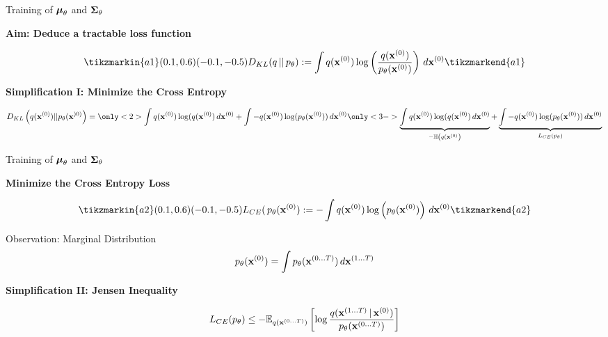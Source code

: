 \documentclass[aspectratio=169, 10pt]{beamer}
\theoremstyle{definition}
\begin{document}
\begin{frame}{Training of ${\boldsymbol{\mu}}_\theta$ and  ${\boldsymbol{\Sigma}}_\theta$}
  \begin{center}
    \textbf{Aim: Deduce a tractable loss function}
  \end{center}
    \[
      \tikzmarkin{a1}(0.1,0.6)(-0.1,-0.5)D_{KL}(q\,||\,p_\theta):=\int q(\xx^{(0)})\log\left(
      \frac{q(\xx^{(0)})}{p_\theta(\xx^{(0)})}\right)\,d
      \xx^{(0)}\tikzmarkend{a1}
    \]
    \vfill
    \pause
    \begin{center}
      \bf
      Simplification I: Minimize the Cross Entropy
    \end{center}
    \[
    D_{KL}\left( q(\xx^{(0)})||p_\theta(\xx^{)0)} \right) =
    \only<2>{\int q(\xx^{(0)})\log(q(\xx^{(0)})\,d\xx^{(0)}+
      \int-q(\xx^{(0)})\log(p_\theta(\xx^{(0)}))\,d\xx^{(0)}}
    \only<3->{\underbrace{\int q(\xx^{(0)})\log(q(\xx^{(0)})\,d\xx^{(0)}}_{-\Hh\left(
      q(\xx^{(0)}\right)} + 
    \underbrace{\int-q(\xx^{(0)})\log(p_\theta(\xx^{(0)}))\,d\xx^{(0)}}_{L_{CE}(p_\theta)}}
    \]
\end{frame}
\begin{frame}{Training of ${\boldsymbol{\mu}}_\theta$ and  ${\boldsymbol{\Sigma}}_\theta$}
  \begin{center}
    \bf
    Minimize the Cross Entropy Loss
  \end{center}
    \[
      \tikzmarkin{a2}(0.1,0.6)(-0.1,-0.5)L_{CE}(\,p_\theta(\xx^{(0)}):=-\int
        q(\xx^{(0)})\log\left( p_\theta(\xx^{(0)})\right)\,d
      \xx^{(0)}\tikzmarkend{a2}
    \]
    \pause
    \begin{block}{Observation: Marginal Distribution}
      \[
        p_\theta({\mathbf{x}}^{(0)})=\int p_\theta({\mathbf{x}}^{(0\ldots T)})\,
        d{\mathbf{x}}^{(1\ldots T)}
      \]
    \end{block}
    \pause
    \begin{center}
      \bf
      Simplification II: Jensen Inequality
    \end{center}
    \[
      L_{CE}(p_\theta) \le - \mathbb{E}_{q({\mathbf{x}}^{(0\ldots T)})}\left[ \log
      \frac{q({\mathbf{x}}^{(1\ldots T)}\,\vert\, 
    {\mathbf{x}}^{(0)})}{p_\theta({\mathbf{x}}^{(0\ldots T)})}\right]
    \]
\end{frame}
\end{document}
